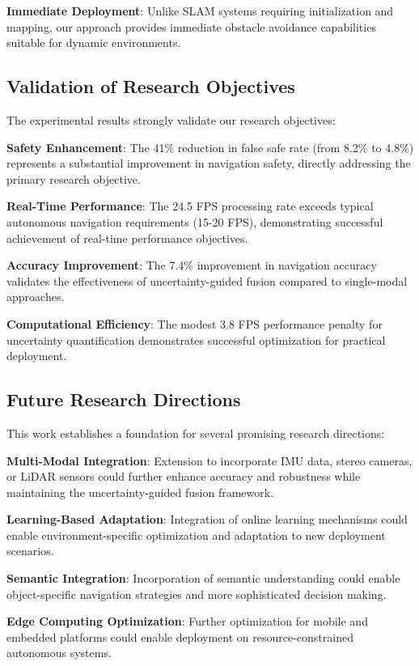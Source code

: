 \documentclass[10pt]{article}
\begin{document}
\textbf{Immediate Deployment}: Unlike SLAM systems requiring initialization and mapping, our approach provides immediate obstacle avoidance capabilities suitable for dynamic environments.

\subsection{Validation of Research Objectives}

The experimental results strongly validate our research objectives:

\textbf{Safety Enhancement}: The 41\% reduction in false safe rate (from 8.2\% to 4.8\%) represents a substantial improvement in navigation safety, directly addressing the primary research objective.

\textbf{Real-Time Performance}: The 24.5 FPS processing rate exceeds typical autonomous navigation requirements (15-20 FPS), demonstrating successful achievement of real-time performance objectives.

\textbf{Accuracy Improvement}: The 7.4\% improvement in navigation accuracy validates the effectiveness of uncertainty-guided fusion compared to single-modal approaches.

\textbf{Computational Efficiency}: The modest 3.8 FPS performance penalty for uncertainty quantification demonstrates successful optimization for practical deployment.

\subsection{Future Research Directions}

This work establishes a foundation for several promising research directions:

\textbf{Multi-Modal Integration}: Extension to incorporate IMU data, stereo cameras, or LiDAR sensors could further enhance accuracy and robustness while maintaining the uncertainty-guided fusion framework.

\textbf{Learning-Based Adaptation}: Integration of online learning mechanisms could enable environment-specific optimization and adaptation to new deployment scenarios.

\textbf{Semantic Integration}: Incorporation of semantic understanding could enable object-specific navigation strategies and more sophisticated decision making.

\textbf{Edge Computing Optimization}: Further optimization for mobile and embedded platforms could enable deployment on resource-constrained autonomous systems.
\end{document}
